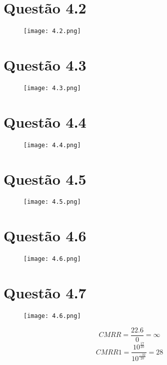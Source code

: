 \documentclass[a4paper,9pt]{extarticle}
\begin{document}
	 \section{Questão 4.2}
	 	\begin{figure}[H]
			\centering
			\captionsetup{justification=centering}
			\texttt{[image: 4.2.png]}
			\caption{}
		\end{figure}
	 \section{Questão 4.3}
	 \begin{figure}[H]
			\centering
			\captionsetup{justification=centering}
			\texttt{[image: 4.3.png]}
			\caption{}
		\end{figure}

         \section{Questão 4.4}
	 \begin{figure}[H]
			\centering
			\captionsetup{justification=centering}
			\texttt{[image: 4.4.png]}
			\caption{}
		\end{figure}

	 \section{Questão 4.5}
	 \begin{figure}[H]
			\centering
			\captionsetup{justification=centering}
			\texttt{[image: 4.5.png]}
			\caption{}
		\end{figure}


	 \section{Questão 4.6}
	 \begin{figure}[H]
                          \centering
                          \captionsetup{justification=centering}
                          \texttt{[image: 4.6.png]}
                          \caption{}
                  \end{figure}
	 \section{Questão 4.7}
		\begin{figure}[H]
                            \centering
                            \captionsetup{justification=centering}
                            \texttt{[image: 4.6.png]}
                            \caption{}
                    \end{figure}
		    \begin{center}
			    \begin{equation}
				    CMRR=\frac{22.6}{0}=\infty
				\end{equation}
			\begin{equation}
				CMRR1=\frac{10^{\frac{17}{20}}}{10^{\frac{-32}{20}}}=28
			\end{equation}
		\end{center}
\end{document}
